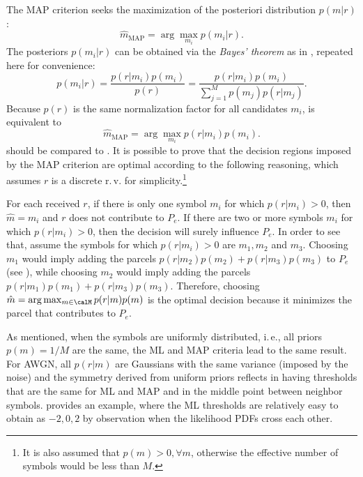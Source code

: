 The MAP criterion seeks the maximization of the posteriori distribution $p(m|r)$:
\begin{equation}
\hat m_\textrm{MAP} = \arg \max_{m_i} p(m_i|r).
\label{eq:map0}
\end{equation}
The posteriors $p(m_i|r)$ can be obtained via the \emph{Bayes' theorem} as in  , repeated here for convenience:
\begin{equation*}
p(m_i|r) = \frac{p(r|m_i)p(m_i)}{p(r)} = \frac{p(r|m_i)p(m_i)}{\sum_{j=1}^M p(m_j)p(r|m_j)}.
\label{eq:bayestheorem}
\end{equation*}
Because $p(r)$ is the same normalization factor for all candidates $m_i$,  is equivalent to
\begin{equation}
\hat m_\textrm{MAP} = \arg \max_{m_i} p(r|m_i)p(m_i).
\label{eq:map}
\end{equation}
 should be compared to . It is possible to prove that the decision regions imposed by the MAP criterion are optimal according to the following reasoning, which assumes $r$ is a discrete r.\,v. for simplicity.\footnote{It is also assumed that $p(m)>0, \forall m$, otherwise the effective number of symbols would be less than $M$.} 

For each received $r$, if
there is only one symbol $m_i$ for which $p(r|m_i)>0$, then $\hat m = m_i$ and $r$ does not contribute to $P_e$.
If there are two or more symbols $m_i$ for which $p(r|m_i)>0$, then the decision will surely influence $P_e$. In order to see that, assume the symbols for which $p(r|m_i)>0$ are $m_1, m_2$ and $m_3$. Choosing $m_1$ would imply adding the parcels $p(r|m_2)p(m_2)+p(r|m_3)p(m_3)$ to $P_e$ (see ), while choosing $m_2$ would imply adding the parcels $p(r|m_1)p(m_1)+p(r|m_3)p(m_3)$. Therefore, choosing $\hat m = \arg \max_{m \in \calM} p(r|m)p(m)$ is the optimal decision because it minimizes the parcel that contributes to $P_e$.

As mentioned, when the symbols are uniformly distributed, i.\,e., all priors $p(m)=1/M$ are the same, the ML and MAP criteria lead to the same result.
For AWGN, all $p(r|m)$ are Gaussians with the same variance (imposed by the noise) and the symmetry derived from uniform priors reflects in having thresholds that are the same for ML and MAP and in the middle point between neighbor symbols.  provides an example, where the ML thresholds are relatively easy to obtain as $-2,0,2$ by observation when the likelihood PDFs cross each other.

